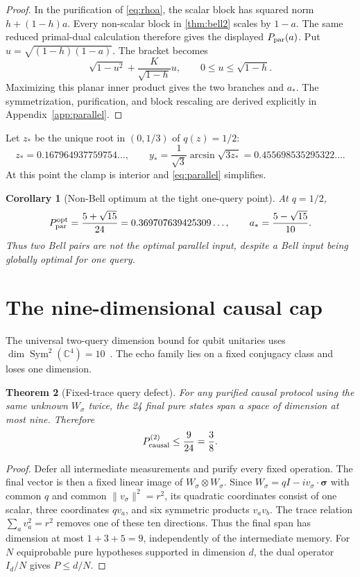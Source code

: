 \documentclass[11pt]{article}
\newtheorem{theorem}{Theorem}[section]
\newtheorem{corollary}[theorem]{Corollary}
\theoremstyle{definition}
\begin{document}
\begin{proof}
In the purification of \cref{eq:rhoa}, the scalar block has squared norm
$h+(1-h)a$.  Every non-scalar block in \cref{thm:bell2} scales by $1-a$.
The same reduced primal-dual calculation therefore gives the displayed
$P_{\rm par}(a)$.  Put $u=\sqrt{(1-h)(1-a)}$.  The bracket becomes
\[
 \sqrt{1-u^2}+\frac{K}{\sqrt{1-h}}u,
 \qquad 0\le u\le\sqrt{1-h}.
\]
Maximizing this planar inner product gives the two branches and $a_*$.  The
symmetrization, purification, and block rescaling are derived explicitly in
Appendix~\ref{app:parallel}.
\end{proof}

Let $z_*$ be the unique root in $(0,1/3)$ of $q(z)=1/2$:
\[
 z_*=0.167964937759754\ldots,\qquad
 y_*=\frac1{\sqrt3}\arcsin\sqrt{3z_*}
     =0.455698535295322\ldots.
\]
At this point the clamp is interior and \cref{eq:parallel} simplifies.

\begin{corollary}[Non-Bell optimum at the tight one-query point]
At $q=1/2$,
\begin{equation}\label{eq:parroot}
 P_{\rm par}^{\rm opt}=\frac{5+\sqrt{15}}{24}
 =0.369707639425309\ldots,\qquad
 a_*=\frac{5-\sqrt{15}}{10}.
\end{equation}
Thus two Bell pairs are not the optimal parallel input, despite a Bell input
being globally optimal for one query.
\end{corollary}

\section{The nine-dimensional causal cap}

The universal two-query dimension bound for qubit unitaries uses
$\dim\operatorname{Sym}^2(\mathbb C^4)=10$~\cite{bavaresco2022}.  The echo
family lies on a fixed conjugacy class and loses one dimension.

\begin{theorem}[Fixed-trace query defect]\label{thm:rankcap}
For any purified causal protocol using the same unknown $W_\sigma$ twice, the
24 final pure states span a space of dimension at most nine.  Therefore
\begin{equation}\label{eq:causalcap}
 P_{\rm causal}^{(2)}\le\frac9{24}=\frac38.
\end{equation}
\end{theorem}

\begin{proof}
Defer all intermediate measurements and purify every fixed operation.  The
final vector is then a fixed linear image of $W_\sigma\otimes W_\sigma$.  Since
$W_\sigma=qI-i v_\sigma\cdot\bm\sigma$ with common $q$ and common
$\lVert v_\sigma\rVert^2=r^2$, its quadratic coordinates consist of one
scalar, three coordinates $qv_a$, and six symmetric products $v_av_b$.
The trace relation $\sum_a v_a^2=r^2$ removes one of these ten directions.
Thus the final span has dimension at most $1+3+5=9$, independently of the
intermediate memory.  For $N$ equiprobable pure hypotheses supported in
dimension $d$, the dual operator $I_d/N$ gives $P\le d/N$.
\end{proof}
\end{document}
